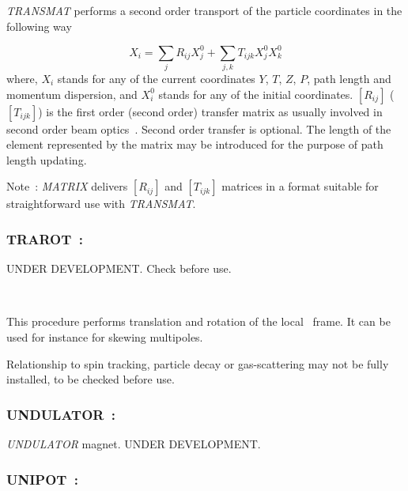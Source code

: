 {\textsl{TRANSMAT} performs a second order transport of the particle coordinates 
in the following way 

$$ X_i = \sum_j R_{ij}X^0_j + \sum_{j,k} T_{ijk}X^0_jX^0_k $$
%
 where, $ X_i $ stands for any of the current coordinates $ Y$, $T$, $Z$, $P $, path length and 
momentum dispersion, and $ X^0_i $ stands for any of the initial coordinates.
$[R_{ij}]$ ($[T_{ijk}]$) is the first order (second order) 
transfer matrix as usually involved in second order beam optics~\cite{Biblio10}.      %
Second order transfer is optional.  The length of the element represented by 
the matrix may be introduced for the purpose of path length updating.  

\bigskip

\noindent Note~: \textsl{MATRIX} delivers $[R_{ij}]$ and $[T_{ijk}]$ matrices in a format 
suitable for straightforward use with \textsl{TRANSMAT}.




\newpage

\subsubsection*{TRAROT~: \TRAROTTitl} \label{TRAROT} 
\medskip


UNDER DEVELOPMENT. Check before use. 

~

\noindent  This procedure performs translation and rotation of the local \zgou\ frame. It can be used for instance 
for skewing multipoles. 

\bigskip

\noindent Relationship to spin tracking, 
particle decay or gas-scattering may not  be fully installed, to be checked before use. 





\newpage


\subsubsection*{UNDULATOR~: \UNDULATORTitl}\label{UNDULATOR}  

\medskip


\textsl{UNDULATOR} magnet. UNDER DEVELOPMENT. 



\newpage

\subsubsection*{UNIPOT~: \UNIPOTTitl} \label{UNIPOT} 
\medskip 

}
